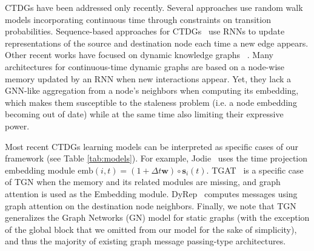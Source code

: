 \documentclass{article}
\begin{document}
CTDGs have been addressed only recently. Several approaches use random walk models \citep{10.1145/3184558.3191526, 8622109, bastas2019evolve2vec} incorporating continuous time through constraints on transition probabilities. Sequence-based approaches for CTDGs~\citep{10.1145/3292500.3330895, 10.5555/3305890.3306039, trivedi2018dyrep, ma2018streaming} use RNNs to update representations of the source and destination node each time a new edge appears. Other recent works have focused on dynamic knowledge graphs ~\citep{goel2019diachronic, xu2019temporal, dasgupta-etal-2018-hyte, garcia-duran-etal-2018-learning}. 
%
Many architectures for continuous-time dynamic graphs are based on a node-wise memory updated by an RNN when new interactions appear. Yet, they lack a GNN-like aggregation from a node's neighbors when computing its embedding, which makes them susceptible to the staleness problem (i.e. a node embedding becoming out of date) while at the same time also limiting their expressive power.


Most recent CTDGs learning models can be interpreted as specific cases of our framework (see Table \ref{tab:models}). For example, 
Jodie~\citep{10.1145/3292500.3330895} uses the time projection embedding module $\mathrm{emb}(i, t) = (1 + \Delta t \mathbf{w}) \circ \mathbf{s}_i(t)$. 
TGAT~\citep{Xu2020Inductive} is a specific case of TGN when the memory and its related modules are missing, and graph attention is used as the Embedding module.  
DyRep~\citep{trivedi2018dyrep} computes messages using graph attention on the destination node neighbors. 
%
%
Finally, we note that TGN generalizes the Graph Networks (GN) model \citep{battaglia2018relational} for static graphs (with the exception of the global block that we omitted from our model for the sake of simplicity), and thus the majority of existing graph message passing-type architectures.

\end{document}

